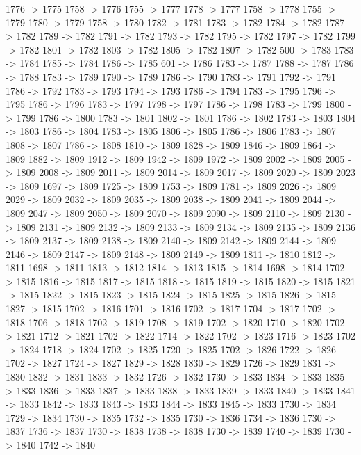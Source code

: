 {	1776 -> 1775
	1758 -> 1776
	1755 -> 1777
	1778 -> 1777
	1758 -> 1778
	1755 -> 1779
	1780 -> 1779
	1758 -> 1780
	1782 -> 1781
	1783 -> 1782
	1784 -> 1782
	1787 -> 1782
	1789 -> 1782
	1791 -> 1782
	1793 -> 1782
	1795 -> 1782
	1797 -> 1782
	1799 -> 1782
	1801 -> 1782
	1803 -> 1782
	1805 -> 1782
	1807 -> 1782
	500 -> 1783
	1783 -> 1784
	1785 -> 1784
	1786 -> 1785
	601 -> 1786
	1783 -> 1787
	1788 -> 1787
	1786 -> 1788
	1783 -> 1789
	1790 -> 1789
	1786 -> 1790
	1783 -> 1791
	1792 -> 1791
	1786 -> 1792
	1783 -> 1793
	1794 -> 1793
	1786 -> 1794
	1783 -> 1795
	1796 -> 1795
	1786 -> 1796
	1783 -> 1797
	1798 -> 1797
	1786 -> 1798
	1783 -> 1799
	1800 -> 1799
	1786 -> 1800
	1783 -> 1801
	1802 -> 1801
	1786 -> 1802
	1783 -> 1803
	1804 -> 1803
	1786 -> 1804
	1783 -> 1805
	1806 -> 1805
	1786 -> 1806
	1783 -> 1807
	1808 -> 1807
	1786 -> 1808
	1810 -> 1809
	1828 -> 1809
	1846 -> 1809
	1864 -> 1809
	1882 -> 1809
	1912 -> 1809
	1942 -> 1809
	1972 -> 1809
	2002 -> 1809
	2005 -> 1809
	2008 -> 1809
	2011 -> 1809
	2014 -> 1809
	2017 -> 1809
	2020 -> 1809
	2023 -> 1809
	1697 -> 1809
	1725 -> 1809
	1753 -> 1809
	1781 -> 1809
	2026 -> 1809
	2029 -> 1809
	2032 -> 1809
	2035 -> 1809
	2038 -> 1809
	2041 -> 1809
	2044 -> 1809
	2047 -> 1809
	2050 -> 1809
	2070 -> 1809
	2090 -> 1809
	2110 -> 1809
	2130 -> 1809
	2131 -> 1809
	2132 -> 1809
	2133 -> 1809
	2134 -> 1809
	2135 -> 1809
	2136 -> 1809
	2137 -> 1809
	2138 -> 1809
	2140 -> 1809
	2142 -> 1809
	2144 -> 1809
	2146 -> 1809
	2147 -> 1809
	2148 -> 1809
	2149 -> 1809
	1811 -> 1810
	1812 -> 1811
	1698 -> 1811
	1813 -> 1812
	1814 -> 1813
	1815 -> 1814
	1698 -> 1814
	1702 -> 1815
	1816 -> 1815
	1817 -> 1815
	1818 -> 1815
	1819 -> 1815
	1820 -> 1815
	1821 -> 1815
	1822 -> 1815
	1823 -> 1815
	1824 -> 1815
	1825 -> 1815
	1826 -> 1815
	1827 -> 1815
	1702 -> 1816
	1701 -> 1816
	1702 -> 1817
	1704 -> 1817
	1702 -> 1818
	1706 -> 1818
	1702 -> 1819
	1708 -> 1819
	1702 -> 1820
	1710 -> 1820
	1702 -> 1821
	1712 -> 1821
	1702 -> 1822
	1714 -> 1822
	1702 -> 1823
	1716 -> 1823
	1702 -> 1824
	1718 -> 1824
	1702 -> 1825
	1720 -> 1825
	1702 -> 1826
	1722 -> 1826
	1702 -> 1827
	1724 -> 1827
	1829 -> 1828
	1830 -> 1829
	1726 -> 1829
	1831 -> 1830
	1832 -> 1831
	1833 -> 1832
	1726 -> 1832
	1730 -> 1833
	1834 -> 1833
	1835 -> 1833
	1836 -> 1833
	1837 -> 1833
	1838 -> 1833
	1839 -> 1833
	1840 -> 1833
	1841 -> 1833
	1842 -> 1833
	1843 -> 1833
	1844 -> 1833
	1845 -> 1833
	1730 -> 1834
	1729 -> 1834
	1730 -> 1835
	1732 -> 1835
	1730 -> 1836
	1734 -> 1836
	1730 -> 1837
	1736 -> 1837
	1730 -> 1838
	1738 -> 1838
	1730 -> 1839
	1740 -> 1839
	1730 -> 1840
	1742 -> 1840
}
